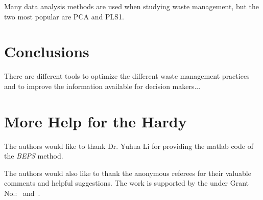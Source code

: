 \documentclass[sigconf]{acmart}
\begin{document}
Many data analysis methods are used when studying waste management, but the two most popular are PCA and PLS1. 
~\cite{bohm2013}




\section{Conclusions}

There are different tools to optimize the different waste management practices  and to improve the information available for decision makers...


\appendix



\section{More Help for the Hardy}
\appendix





\begin{acks}

  The authors would like to thank Dr. Yuhua Li for providing the
  matlab code of the \textit{BEPS} method.

  The authors would also like to thank the anonymous referees for
  their valuable comments and helpful suggestions. The work is
  supported by the  under Grant
  No.:~
  and~.

\end{acks}


 
\end{document}
